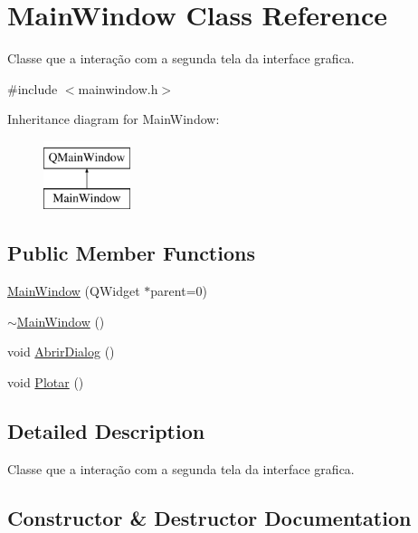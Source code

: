 \hypertarget{classMainWindow}{}\section{Main\+Window Class Reference}
\label{classMainWindow}


Classe que a interação com a segunda tela da interface grafica.  




{\ttfamily \#include $<$mainwindow.\+h$>$}

Inheritance diagram for Main\+Window\+:\begin{figure}[H]
\begin{center}
\leavevmode
\includegraphics[height=2.000000cm]{classMainWindow}
\end{center}
\end{figure}
\subsection*{Public Member Functions}
\begin{DoxyCompactItemize}
\item 
\hyperlink{classMainWindow_a8b244be8b7b7db1b08de2a2acb9409db}{Main\+Window} (Q\+Widget $\ast$parent=0)
\item 
\hyperlink{classMainWindow_ae98d00a93bc118200eeef9f9bba1dba7}{$\sim$\+Main\+Window} ()
\item 
void \hyperlink{classMainWindow_a7c2ac5ce98b2a5de2928e730e48dcfd0}{Abrir\+Dialog} ()
\item 
void \hyperlink{classMainWindow_aa878ce12d90414ed30463be34b4eea91}{Plotar} ()
\end{DoxyCompactItemize}


\subsection{Detailed Description}
Classe que a interação com a segunda tela da interface grafica. 

\subsection{Constructor \& Destructor Documentation}
\hypertarget{classMainWindow_a8b244be8b7b7db1b08de2a2acb9409db}{}
